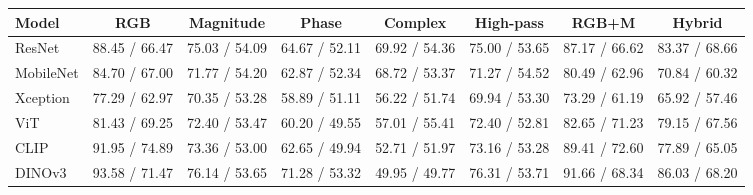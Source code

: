 \begin{tabular}{lccccccc}
\toprule
Model & RGB & Magnitude & Phase & Complex & High-pass & RGB+M & Hybrid \\
\midrule
ResNet & 88.45 / 66.47 & 75.03 / 54.09 & 64.67 / 52.11 & 69.92 / 54.36 & 75.00 / 53.65 & 87.17 / 66.62 & 83.37 / 68.66 \\
MobileNet & 84.70 / 67.00 & 71.77 / 54.20 & 62.87 / 52.34 & 68.72 / 53.37 & 71.27 / 54.52 & 80.49 / 62.96 & 70.84 / 60.32 \\
Xception & 77.29 / 62.97 & 70.35 / 53.28 & 58.89 / 51.11 & 56.22 / 51.74 & 69.94 / 53.30 & 73.29 / 61.19 & 65.92 / 57.46 \\
ViT & 81.43 / 69.25 & 72.40 / 53.47 & 60.20 / 49.55 & 57.01 / 55.41 & 72.40 / 52.81 & 82.65 / 71.23 & 79.15 / 67.56 \\
CLIP & 91.95 / 74.89 & 73.36 / 53.00 & 62.65 / 49.94 & 52.71 / 51.97 & 73.16 / 53.28 & 89.41 / 72.60 & 77.89 / 65.05 \\
DINOv3 & 93.58 / 71.47 & 76.14 / 53.65 & 71.28 / 53.32 & 49.95 / 49.77 & 76.31 / 53.71 & 91.66 / 68.34 & 86.03 / 68.20 \\
\bottomrule
\end{tabular}
